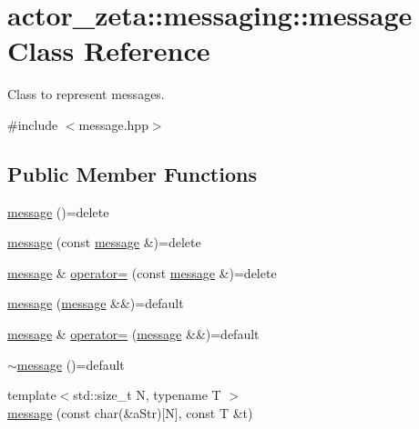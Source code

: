 \hypertarget{classactor__zeta_1_1messaging_1_1message}{}\section{actor\+\_\+zeta\+:\+:messaging\+:\+:message Class Reference}
\label{classactor__zeta_1_1messaging_1_1message}


Class to represent messages.  




{\ttfamily \#include $<$message.\+hpp$>$}

\subsection*{Public Member Functions}
\begin{DoxyCompactItemize}
\item 
\hyperlink{classactor__zeta_1_1messaging_1_1message_ad2d5ed4012814ff6e374eab24bb6079d}{message} ()=delete
\item 
\hyperlink{classactor__zeta_1_1messaging_1_1message_aedfd2ae19160098b4b3616bf121854b3}{message} (const \hyperlink{classactor__zeta_1_1messaging_1_1message}{message} \&)=delete
\item 
\hyperlink{classactor__zeta_1_1messaging_1_1message}{message} \& \hyperlink{classactor__zeta_1_1messaging_1_1message_a3829befdc05243773eb02668c830a25a}{operator=} (const \hyperlink{classactor__zeta_1_1messaging_1_1message}{message} \&)=delete
\item 
\hyperlink{classactor__zeta_1_1messaging_1_1message_a55927d9741c28bd3bc003a4daf4e793d}{message} (\hyperlink{classactor__zeta_1_1messaging_1_1message}{message} \&\&)=default
\item 
\hyperlink{classactor__zeta_1_1messaging_1_1message}{message} \& \hyperlink{classactor__zeta_1_1messaging_1_1message_a3cfe617e41808c075afa2dbd32ea9ef4}{operator=} (\hyperlink{classactor__zeta_1_1messaging_1_1message}{message} \&\&)=default
\item 
\hyperlink{classactor__zeta_1_1messaging_1_1message_a984fb448900c694424545be2f44be846}{$\sim$message} ()=default
\item 
{\footnotesize template$<$std\+::size\+\_\+t N, typename T $>$ }\\\hyperlink{classactor__zeta_1_1messaging_1_1message_a477f95504ed3d8ea6097dfaa1b053ade}{message} (const char(\&a\+Str)\mbox{[}N\mbox{]}, const T \&t)
\item 

\end{DoxyCompactItemize}
